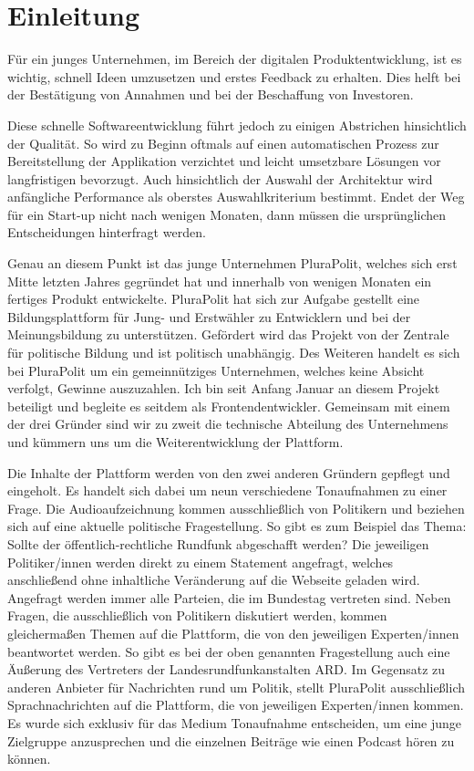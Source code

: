 \section{Einleitung}

Für ein junges Unternehmen, im Bereich der digitalen Produktentwicklung, ist es wichtig, schnell Ideen umzusetzen und erstes Feedback zu erhalten. Dies helft bei der Bestätigung von Annahmen und bei der Beschaffung von Investoren.

Diese schnelle Softwareentwicklung führt jedoch zu einigen Abstrichen hinsichtlich der Qualität. So wird zu Beginn oftmals auf einen automatischen Prozess zur Bereitstellung der Applikation verzichtet und leicht umsetzbare Lösungen vor langfristigen bevorzugt. Auch hinsichtlich der Auswahl der Architektur wird anfängliche Performance als oberstes Auswahlkriterium bestimmt. Endet der Weg für ein Start-up nicht nach wenigen Monaten, dann müssen die ursprünglichen Entscheidungen hinterfragt werden.

Genau an diesem Punkt ist das junge Unternehmen PluraPolit, welches sich erst Mitte letzten Jahres gegründet hat und innerhalb von wenigen Monaten ein fertiges Produkt entwickelte. PluraPolit hat sich zur Aufgabe gestellt eine Bildungsplattform für Jung- und Erstwähler zu Entwicklern und bei der Meinungsbildung zu unterstützen. Gefördert wird das Projekt von der Zentrale für politische Bildung und ist politisch unabhängig. Des Weiteren handelt es sich bei PluraPolit um ein gemeinnütziges Unternehmen, welches keine Absicht verfolgt, Gewinne auszuzahlen. Ich bin seit Anfang Januar an diesem Projekt beteiligt und begleite es seitdem als Frontendentwickler. Gemeinsam mit einem der drei Gründer sind wir zu zweit die technische Abteilung des Unternehmens und kümmern uns um die Weiterentwicklung der Plattform.

Die Inhalte der Plattform werden von den zwei anderen Gründern gepflegt und eingeholt. Es handelt sich dabei um neun verschiedene Tonaufnahmen zu einer Frage. Die Audioaufzeichnung kommen ausschließlich von Politikern und beziehen sich auf eine aktuelle politische Fragestellung. So gibt es zum Beispiel das Thema: Sollte der öffentlich-rechtliche Rundfunk abgeschafft werden? Die jeweiligen Politiker/innen werden direkt zu einem Statement angefragt, welches anschließend ohne inhaltliche Veränderung auf die Webseite geladen wird. Angefragt werden immer alle Parteien, die im Bundestag vertreten sind. Neben Fragen, die ausschließlich von Politikern diskutiert werden, kommen gleichermaßen Themen auf die Plattform, die von den jeweiligen Experten/innen beantwortet werden. So gibt es bei der oben genannten Fragestellung auch eine Äußerung des Vertreters der Landesrundfunkanstalten ARD. Im Gegensatz zu anderen Anbieter für Nachrichten rund um Politik, stellt PluraPolit ausschließlich Sprachnachrichten auf die Plattform, die von jeweiligen Experten/innen kommen. Es wurde sich exklusiv für das Medium Tonaufnahme entscheiden, um eine junge Zielgruppe anzusprechen und die einzelnen Beiträge wie einen Podcast hören zu können.

